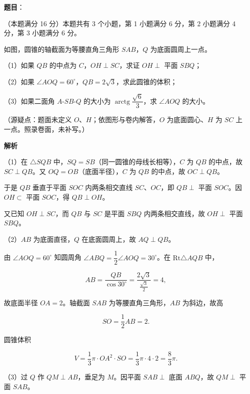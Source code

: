 \begin{answer}

\textbf{题目}：

（本题满分 16 分）本题共有 3 个小题，第 1 小题满分 6 分，第 2 小题满分 4 分，第 3 小题满分 6 分。

如图，圆锥的轴截面为等腰直角三角形 $SAB$，$Q$ 为底面圆周上一点。

（1）如果 $QB$ 的中点为 $C$，$OH\perp SC$，求证 $OH\perp$ 平面 $SBQ$；

（2）如果 $\angle AOQ=60^{\circ}$，$QB=2\sqrt{3}$，求此圆锥的体积；

（3）如果二面角 $A\text{-}SB\text{-}Q$ 的大小为 $\operatorname{arctg}\dfrac{\sqrt{6}}{3}$，求 $\angle AOQ$ 的大小。
\nopagebreak[4]
\begin{center}\end{center}
\nopagebreak[4]
（源疑点：题面未定义 $O$、$H$；依图形与卷内解答，$O$ 为底面圆心、$H$ 为 $SC$ 上一点。照录卷面，未补写。）

\textbf{解析}

（1）在 $\triangle SQB$ 中，$SQ=SB$（同一圆锥的母线长相等），$C$ 为 $QB$ 的中点，故 $SC\perp QB$。又 $OQ=OB$（底面半径），$C$ 为 $QB$ 的中点，故 $OC\perp QB$。

于是 $QB$ 垂直于平面 $SOC$ 内两条相交直线 $SC$、$OC$，即 $QB\perp$ 平面 $SOC$。因 $OH\subset$ 平面 $SOC$，得 $QB\perp OH$。

又已知 $OH\perp SC$，而 $QB$ 与 $SC$ 是平面 $SBQ$ 内两条相交直线，故 $OH\perp$ 平面 $SBQ$。

（2）$AB$ 为底面直径，$Q$ 在底面圆周上，故 $AQ\perp QB$。

由 $\angle AOQ=60^{\circ}$ 知圆周角 $\angle ABQ=\dfrac{1}{2}\angle AOQ=30^{\circ}$。在 $\mathrm{Rt}\triangle AQB$ 中，

\nopagebreak[4]
\[
AB=\frac{QB}{\cos 30^{\circ}}=\frac{2\sqrt{3}}{\frac{\sqrt{3}}{2}}=4,
\]

故底面半径 $OA=2$。轴截面 $SAB$ 为等腰直角三角形，$AB$ 为斜边，故高

\nopagebreak[4]
\[
SO=\frac{1}{2}AB=2.
\]

圆锥体积

\nopagebreak[4]
\[
V=\frac{1}{3}\pi\cdot OA^{2}\cdot SO=\frac{1}{3}\pi\cdot 4\cdot 2=\frac{8}{3}\pi.
\]

（3）过 $Q$ 作 $QM\perp AB$，垂足为 $M$。因平面 $SAB\perp$ 底面 $ABQ$，故 $QM\perp$ 平面 $SAB$。


\end{answer}
